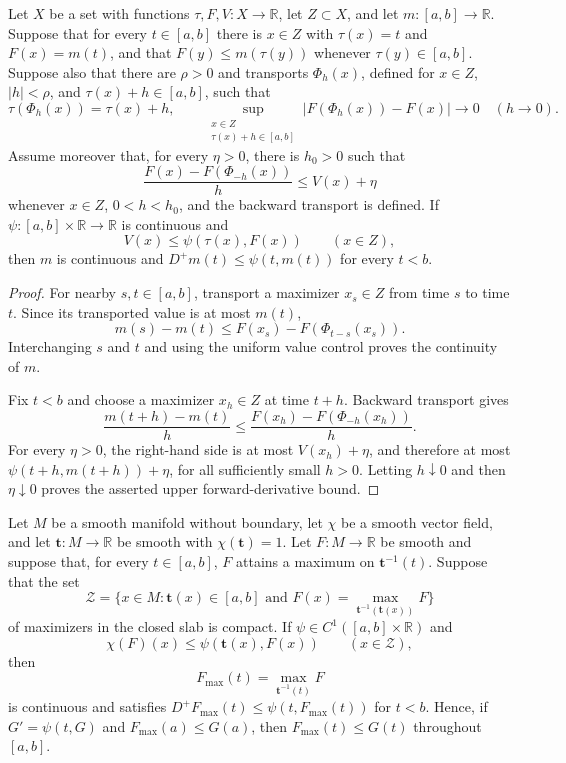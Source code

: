 \begin{lemma}
\label{lem:uniform-time-slice-transport}
\notready
Let $X$ be a set with functions $\tau,F,V\colon X\to\mathbb R$, let
$Z\subset X$, and let $m\colon[a,b]\to\mathbb R$.  Suppose that for every
$t\in[a,b]$ there is $x\in Z$ with $\tau(x)=t$ and $F(x)=m(t)$, and that
$F(y)\le m(\tau(y))$ whenever $\tau(y)\in[a,b]$.  Suppose also that there
are $\rho>0$ and transports $\Phi_h(x)$, defined for $x\in Z$,
$|h|<\rho$, and $\tau(x)+h\in[a,b]$, such that
\[
 \tau(\Phi_h(x))=\tau(x)+h,
 \qquad
 \sup_{\substack{x\in Z\\ \tau(x)+h\in[a,b]}}
 |F(\Phi_h(x))-F(x)|\longrightarrow0
 \quad(h\to0).
\]
Assume moreover that, for every $\eta>0$, there is $h_0>0$ such that
\[
 \frac{F(x)-F(\Phi_{-h}(x))}{h}\le V(x)+\eta
\]
whenever $x\in Z$, $0<h<h_0$, and the backward transport is defined.
If $\psi\colon[a,b]\times\mathbb R\to\mathbb R$ is continuous and
\[
 V(x)\le\psi(\tau(x),F(x))\qquad(x\in Z),
\]
then $m$ is continuous and $D^+m(t)\le\psi(t,m(t))$ for every $t<b$.
\end{lemma}

\begin{proof}
For nearby $s,t\in[a,b]$, transport a maximizer $x_s\in Z$ from time $s$
to time $t$.  Since its transported value is at most $m(t)$,
\[
 m(s)-m(t)\le F(x_s)-F(\Phi_{t-s}(x_s)).
\]
Interchanging $s$ and $t$ and using the uniform value control proves the
continuity of $m$.

Fix $t<b$ and choose a maximizer $x_h\in Z$ at time $t+h$.  Backward
transport gives
\[
 \frac{m(t+h)-m(t)}h
 \le \frac{F(x_h)-F(\Phi_{-h}(x_h))}{h}.
\]
For every $\eta>0$, the right-hand side is at most
$V(x_h)+\eta$, and therefore at most
$\psi(t+h,m(t+h))+\eta$, for all sufficiently small $h>0$.
Letting $h\downarrow0$ and then $\eta\downarrow0$ proves the asserted
upper forward-derivative bound.
\end{proof}

\begin{theorem}
\label{thm:time-slice-maximum-comparison}
\notready
Let $M$ be a smooth manifold without boundary, let $\chi$ be a smooth vector
field, and let $\mathbf t\colon M\to\mathbb R$ be smooth with
$\chi(\mathbf t)=1$.  Let $F\colon M\to\mathbb R$ be smooth and suppose that,
for every $t\in[a,b]$, $F$ attains a maximum on
$\mathbf t^{-1}(t)$.  Suppose that the set
\[
 \mathcal Z=\{x\in M:\mathbf t(x)\in[a,b]\text{ and }
 F(x)=\max_{\mathbf t^{-1}(\mathbf t(x))}F\}
\]
of maximizers in the closed slab is compact.  If
$\psi\in C^1([a,b]\times\mathbb R)$ and
\[
 \chi(F)(x)\le\psi(\mathbf t(x),F(x))
 \qquad(x\in\mathcal Z),
\]
then
\[
 F_{\max}(t)=\max_{\mathbf t^{-1}(t)}F
\]
is continuous and satisfies
$D^+F_{\max}(t)\le\psi(t,F_{\max}(t))$ for $t<b$.  Hence, if
$G'=\psi(t,G)$ and $F_{\max}(a)\le G(a)$, then
$F_{\max}(t)\le G(t)$ throughout $[a,b]$.
\end{theorem}

